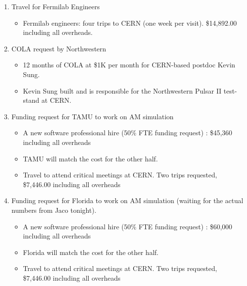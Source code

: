 \begin{enumerate}
\item Travel for Fermilab Engineers

\begin{itemize}
	\item	Fermilab engineers:  four trips to CERN (one week per visit). \$14,892.00 including all overheads. 
	\end{itemize}	

\item COLA request by Northwestern 

	\begin{itemize}
        \item 12 months of COLA at \$1K per month for CERN-based postdoc Kevin Sung.  
        \item Kevin Sung built and is responsible for the Northwestern Pulsar II test-stand at CERN.  
	\end{itemize}


\item Funding request for TAMU to work on AM simulation 
	\begin{itemize}
	\item	 A new software professional hire (50\% FTE funding request) : \$45,360 including all overheads
        \item       TAMU will match the cost for the other half.
	\item	Travel to attend critical meetings at CERN. Two trips requested, \$7,446.00 including all overheads
	\end{itemize}	

\item Funding request for Florida to work on AM simulation  (waiting for the actual numbers from Jaco tonight).
	\begin{itemize}
	\item	 A new software professional hire (50\% FTE funding request) : \$60,000 including all overheads
        \item       Florida will match the cost for the other half.
	\item	Travel to attend critical meetings at CERN. Two trips requested, \$7,446.00 including all overheads
	\end{itemize}	


\end{enumerate}


